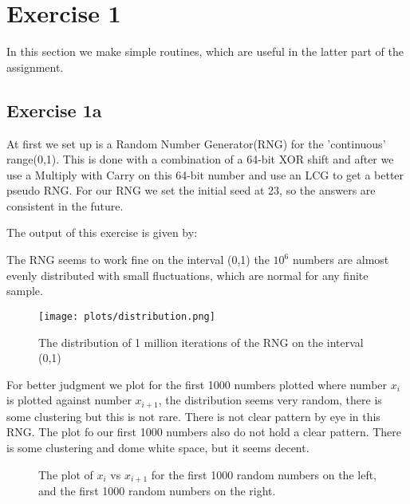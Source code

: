 \section{Exercise 1}
In this section we make simple routines, which are useful in the latter part of the assignment.

\subsection{Exercise 1a}
At first we set up is a Random Number Generator(RNG) for the 'continuous' range(0,1). This is done with a combination of a 64-bit XOR shift and after we use a Multiply with Carry on this 64-bit number and use an LCG to get a better pseudo RNG. For our RNG we set the initial seed at 23, so the answers are consistent in the future. 

The output of this exercise is given by:


The RNG seems to work fine on the interval (0,1) the $10^6$ numbers are almost evenly distributed with small fluctuations, which are normal for any finite sample.
\begin{figure}[h]
   \centering
   \texttt{[image: plots/distribution.png]}
      \caption{The distribution of 1 million iterations of the RNG on the interval (0,1)}
   \end{figure}
  
 
 For better judgment we plot for the first 1000 numbers plotted where number $x_i$ is plotted against number $x_{i+1}$, the distribution seems very random, there is some clustering but this is not rare. There is not clear pattern by eye in this RNG. The plot fo our first 1000 numbers also do not hold a clear pattern. There is some clustering and dome white space, but it seems decent.
 
\begin{figure}
   \centering
    \qquad
    \caption{The plot of $x_i$ vs $x_{i+1}$ for the first 1000 random numbers on the left, and the first 1000 random numbers on the right. }
    \end{figure}
    
    
